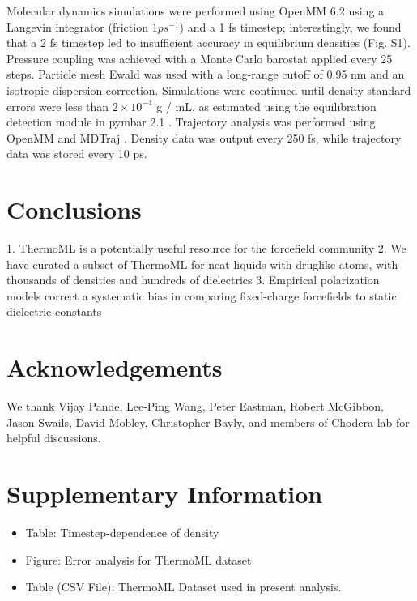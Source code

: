 \documentclass[journal=jacsat,manuscript=article]{achemso}
\begin{document}
Molecular dynamics simulations were performed using OpenMM 6.2 using a Langevin integrator (friction $1 ps^{-1}$) and a 1 fs timestep; interestingly, we found that a 2 fs timestep led to insufficient accuracy in equilibrium densities (Fig. S1).  Pressure coupling was achieved with a Monte Carlo barostat applied every 25 steps.  Particle mesh Ewald \cite{Darden1993} was used with a long-range cutoff of 0.95 nm and an isotropic dispersion correction.  Simulations were continued until density standard errors were less than $2 \times 10^{-4}$ g / mL, as estimated using the equilibration detection module in pymbar 2.1 \cite{shirts2008statistically}.  Trajectory analysis was performed using OpenMM \cite{eastman2012openmm} and MDTraj \cite{mcgibbon2014mdtraj}.  Density data was output every 250 fs, while trajectory data was stored every 10 ps.  

\section{Conclusions}

1.  ThermoML is a potentially useful resource for the forcefield community
2.  We have curated a subset of ThermoML for neat liquids with druglike atoms, with thousands of densities and hundreds of dielectrics
3.  Empirical polarization models correct a systematic bias in comparing fixed-charge forcefields to static dielectric constants


\section{Acknowledgements}

We thank Vijay Pande, Lee-Ping Wang, Peter Eastman, Robert McGibbon, Jason Swails, David Mobley, Christopher Bayly, and members of Chodera lab for helpful discussions.  

\section{Supplementary Information}

\begin{itemize}
 \item Table: Timestep-dependence of density
 \item Figure: Error analysis for ThermoML dataset
 \item Table (CSV File): ThermoML Dataset used in present analysis.
\end{itemize}
\end{document}
